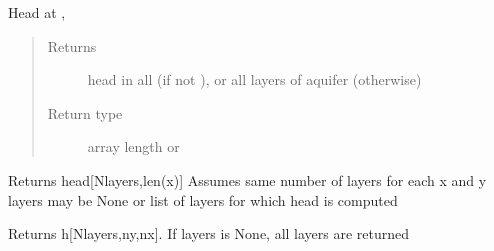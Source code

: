 \documentclass[letterpaper,10pt,english]{sphinxmanual}
\begin{document}
\begin{fulllineitems}
\begin{fulllineitems}
\begin{quote}
\begin{description}
\end{description}\end{quote}

\end{fulllineitems}


\begin{fulllineitems}
\label{\detokenize{models/model3d:timml.model.Model3D.head}}
Head at , 
\begin{quote}\begin{description}
\item[{Returns}] \leavevmode
{} \textendash{} head in all  (if not ), or all layers of aquifer (otherwise)

\item[{Return type}] \leavevmode
array length  or 

\end{description}\end{quote}

\end{fulllineitems}


\begin{fulllineitems}
\label{\detokenize{models/model3d:timml.model.Model3D.headalongline}}
Returns head{[}Nlayers,len(x){]}
Assumes same number of layers for each x and y
layers may be None or list of layers for which head is computed

\end{fulllineitems}


\begin{fulllineitems}
\label{\detokenize{models/model3d:timml.model.Model3D.headgrid}}
Returns h{[}Nlayers,ny,nx{]}.
If layers is None, all layers are returned

\end{fulllineitems}



\end{fulllineitems}
\end{document}
